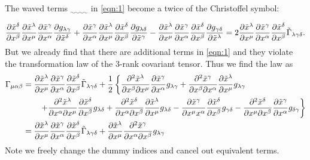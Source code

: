 \documentclass[a4paper,pdftex,10pt]{article}
\begin{document}
The waved terms $\uwave{\qquad}$ in \eqref{eqn:1} become a twice of the Christoffel symbol:
\begin{equation}
  \pdv{\tilde{x}^{\delta}}{x^{\beta}}
  \pdv{\tilde{x}^{\lambda}}{x^{\mu}}\pdv{\tilde{x}^{\gamma}}{x^{\alpha}}
  \pdv{g_{\lambda\gamma}}{\tilde{x}^{\delta}}
  +
  \pdv{\tilde{x}^{\gamma}}{x^{\alpha}}
  \pdv{\tilde{x}^{\lambda}}{x^{\mu}}\pdv{\tilde{x}^{\delta}}{x^{\beta}}
  \pdv{g_{\lambda\delta}}{\tilde{x}^{\gamma}}
  -
  \pdv{\tilde{x}^{\lambda}}{x^{\mu}}
  \pdv{\tilde{x}^{\gamma}}{x^{\alpha}}\pdv{\tilde{x}^{\delta}}{x^{\beta}}
  \pdv{g_{\gamma\delta}}{\tilde{x}^{\lambda}}
  =
  2
  \pdv{\tilde{x}^{\lambda}}{x^{\mu}}
  \pdv{\tilde{x}^{\gamma}}{x^{\alpha}}\pdv{\tilde{x}^{\delta}}{x^{\beta}}
  \tilde{\Gamma}_{\lambda\gamma\delta}
  .
\end{equation}
But we already find that there are additional terms in \eqref{eqn:1} and they violate the transformation law of the 3-rank covariant tensor. Thus we find the law as
\begin{align}
  \Gamma_{\mu\alpha\beta}
   & =
  \pdv{\tilde{x}^{\lambda}}{x^{\mu}}
  \pdv{\tilde{x}^{\gamma}}{x^{\alpha}}\pdv{\tilde{x}^{\delta}}{x^{\beta}}
  \tilde{\Gamma}_{\lambda\gamma\delta}
  +
  \frac{1}{2}
  \left\{
  \pdv{\tilde{x}^{\lambda}}{x^{\beta}}{x^{\mu}}\pdv{\tilde{x}^{\gamma}}{x^{\alpha}}g_{\lambda\gamma}
  +
  \pdv{\tilde{x}^{\gamma}}{x^{\beta}}{x^{\alpha}}\pdv{\tilde{x}^{\lambda}}{x^{\mu}}g_{\lambda\gamma}
  \right.
  \nonumber
  \\
   & \qquad
  \left.
  +
  \pdv{\tilde{x}^{\lambda}}{x^{\alpha}}{x^{\mu}}\pdv{\tilde{x}^{\delta}}{x^{\beta}}g_{\lambda\delta}
  +
  \pdv{\tilde{x}^{\delta}}{x^{\alpha}}{x^{\beta}}\pdv{\tilde{x}^{\lambda}}{x^{\mu}}g_{\lambda\delta}
  -
  \pdv{\tilde{x}^{\gamma}}{x^{\mu}x^{\alpha}}\pdv{\tilde{x}^{\delta}}{x^{\beta}}g_{\gamma\delta}
  -
  \pdv{\tilde{x}^{\delta}}{x^{\mu}}{x^{\beta}}\pdv{\tilde{x}^{\gamma}}{x^{\alpha}}g_{\delta\gamma}
  \right\}
  \nonumber
  \\
  &=
  \pdv{\tilde{x}^{\lambda}}{x^{\mu}}
  \pdv{\tilde{x}^{\gamma}}{x^{\alpha}}\pdv{\tilde{x}^{\delta}}{x^{\beta}}
  \tilde{\Gamma}_{\lambda\gamma\delta}
  +
  \pdv{\tilde{x}^{\lambda}}{x^{\mu}}\pdv{\tilde{x}^{\gamma}}{x^{\alpha}}{x^{\beta}}g_{\lambda\gamma}
\end{align}
Note we freely change the dummy indices and cancel out equivalent terms.




\clearpage
\end{document}
